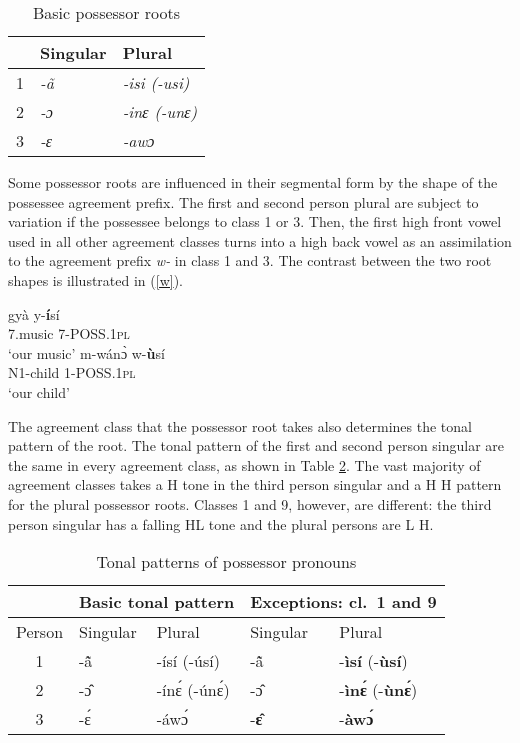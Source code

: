 \begin{table} 
\centering
\begin{tabular}{r|p{3cm}|p{3cm}}
 \midrule
 & Singular & Plural \\
  \midrule
 1 & \itshape{-ã} & \itshape{-isi} (\itshape{-usi}) \\
 2 & \itshape{-ɔ} & \itshape{-inɛ} (\itshape{-unɛ}) \\
 3 & \itshape{-ɛ} & \itshape{-awɔ} \\
  \midrule
\end{tabular}
\caption{Basic possessor roots}
\label{Tab:SegPoss}
\end{table}

 \noindent  Some possessor roots are influenced in their segmental form by the shape of the possessee agreement prefix. The first and second person plural are subject to variation if the possessee belongs to class 1 or 3. Then, the first high front vowel used in all other agreement classes turns into a high back vowel as an assimilation to the agreement prefix {\itshape w-} in class 1 and 3. The contrast between the two root shapes is illustrated in (\ref{w}). 

\begin{exe}
\ex\label{w}
\begin{xlist}
\ex \label{w1}
  \gll     gyà y-{\bfseries í}sí \\
                7.music 7-POSS.1\textsc{pl} \\
    \trans `our music'
\ex\label{w2}
 \gll     m-wánɔ̀ w-{\bfseries ù}sí \\
                N1-child 1-POSS.1\textsc{pl} \\
    \trans `our child'
\end {xlist}
\end {exe}

The agreement class that the possessor root takes also determines the tonal pattern of the root. The tonal pattern of the first and second person singular are the same in every agreement class, as shown in Table \ref{Tab:TonePoss}. The vast majority of agreement classes takes a H tone in the third person singular and a H H pattern for the plural possessor roots. Classes 1 and 9, however, are different: the third person singular has a falling HL tone and the plural persons are L H.

\begin{table} 
\centering
\begin{tabular}{|c|p{2cm}p{3cm}|p{2cm}p{3cm}|}
 \midrule
 & \multicolumn{2}{c}{Basic tonal pattern} & \multicolumn{2}{c|}{Exceptions: cl.~1 and 9} \\
  \midrule
 Person & Singular & Plural & Singular & Plural \\
 1 & -ã̂ & -ísí (-úsí) & -ã̂ & -{\bfseries ìsí} (-{\bfseries ùsí}) \\
 2 & -ɔ̂ & -ínɛ́ (-únɛ́) & -ɔ̂ & -{\bfseries ìnɛ́} (-{\bfseries ùnɛ́}) \\
 3 & -ɛ́ & -áwɔ́ & -{\bfseries ɛ̂} & -{\bfseries àwɔ́} \\
  \midrule
\end{tabular}
\caption{Tonal patterns of possessor pronouns}
\label{Tab:TonePoss}
\end{table}

